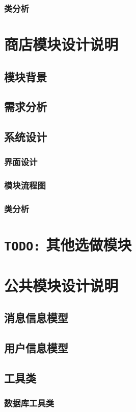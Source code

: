 \documentclass{article}
\begin{document}
\subsubsection{类分析}

\section{商店模块设计说明}
\subsection{模块背景}
\subsection{需求分析}
\subsection{系统设计}
\subsubsection{界面设计}
\subsubsection{模块流程图}
\subsubsection{类分析}


\section{\texttt{TODO:} 其他选做模块}

\section{公共模块设计说明}
\subsection{消息信息模型}
\subsection{用户信息模型}
\subsection{工具类}
\subsubsection{数据库工具类}
\end{document}
